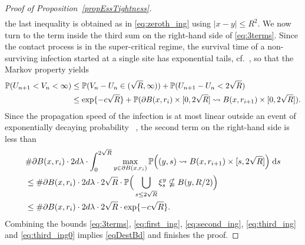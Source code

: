 \begin{proof}[Proof of Proposition~\ref{propEssTightness}]
\begin{align}
\end{align}
	the last inequality is obtained as in \eqref{eq:zeroth_ing} using $|x - y| \le R^2$. We now turn to the term inside the third sum on the right-hand side of \eqref{eq:3terms}. Since the contact process is in the super-critical regime, the survival time of a non-surviving infection started at a single site has exponential tails, cf.~\cite[Proposition 5]{GaretMarch12}, so that the Markov property yields
\begin{equation}\begin{split}\P(U_{n+1} < V_n < \infty) &\leq \P(V_n - U_n \in (\sqrt{R}, \infty)) + \P(U_{n+1} - U_n < 2\sqrt{R})\\
&\leq \exp\{-c\sqrt{R} \} + \P(\partial B(x,r_i) \times [0,2\sqrt{R}] \rightsquigarrow B(x,r_{i+1}) \times[0,2\sqrt{R}]).\end{split}\label{eq:third_ing}
\end{equation}
Since the propagation speed of the infection is at most linear outside an event of exponentially decaying probability ~\cite[Proposition 5]{GaretMarch12}, the second term on the right-hand side is less than
\begin{align}\nonumber&\#\partial B(x,r_i) \cdot 2d\lambda \cdot \int_0^{2\sqrt{R}} \max_{y \in \partial B(x,r_i)} \P\Big((y,s) \rightsquigarrow B(x,r_{i+1})\times [s,2\sqrt{R}] \Big)\; \mathrm{d}s
\\\nonumber&\leq \#\partial B(x,r_i) \cdot 2d\lambda \cdot 2\sqrt{R} \cdot \P\Big(\bigcup_{s \leq 2\sqrt{R}}\xi^y_s \nsubseteq B(y, R/2)\Big) \\&\leq \#\partial B(x,r_i) \cdot 2d\lambda \cdot 2\sqrt{R} \cdot \exp\{-c\sqrt{R}\}.\label{eq:third_ing0}
\end{align}
Combining the bounds \eqref{eq:3terms}, \eqref{eq:first_ing}, \eqref{eq:second_ing}, \eqref{eq:third_ing} and \eqref{eq:third_ing0} implies  \eqref{eqDestBd} and finishes the proof.
\end{proof}

